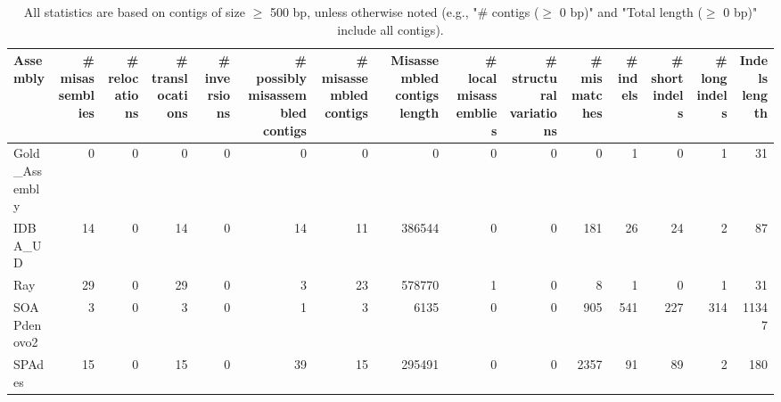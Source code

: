\documentclass[12pt,a4paper]{article}
\begin{document}
\begin{table}[ht]
\begin{center}
\caption{All statistics are based on contigs of size $\geq$ 500 bp, unless otherwise noted (e.g., "\# contigs ($\geq$ 0 bp)" and "Total length ($\geq$ 0 bp)" include all contigs).}
\begin{tabular}{|l*{14}{|r}|}
\hline
Assembly & \# misassemblies &     \# relocations &     \# translocations &     \# inversions & \# possibly misassembled contigs & \# misassembled contigs & Misassembled contigs length & \# local misassemblies & \# structural variations & \# mismatches & \# indels &     \# short indels &     \# long indels & Indels length \\ \hline
Gold\_Assembly & 0 & 0 & 0 & 0 & 0 & 0 & 0 & 0 & 0 & 0 & 1 & 0 & 1 & 31 \\ \hline
IDBA\_UD & 14 & 0 & 14 & 0 & 14 & 11 & 386544 & 0 & 0 & 181 & 26 & 24 & 2 & 87 \\ \hline
Ray & 29 & 0 & 29 & 0 & 3 & 23 & 578770 & 1 & 0 & 8 & 1 & 0 & 1 & 31 \\ \hline
SOAPdenovo2 & 3 & 0 & 3 & 0 & 1 & 3 & 6135 & 0 & 0 & 905 & 541 & 227 & 314 & 11347 \\ \hline
SPAdes & 15 & 0 & 15 & 0 & 39 & 15 & 295491 & 0 & 0 & 2357 & 91 & 89 & 2 & 180 \\ \hline
\end{tabular}
\end{center}
\end{table}
\end{document}
